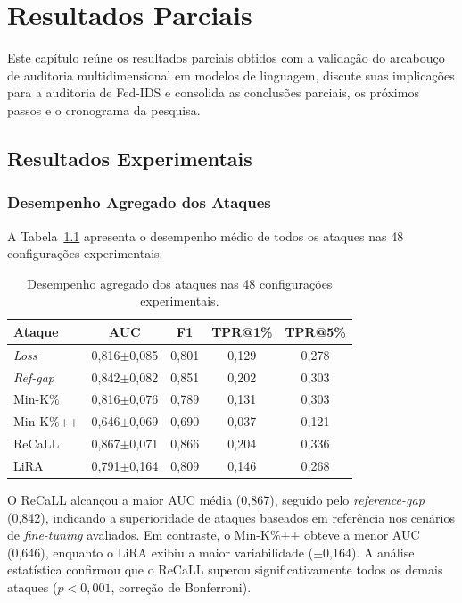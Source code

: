 \documentclass[
	12pt,				%
	openright,			%
	oneside,			%
	a4paper,			%
	english,			%
	french,				%
	spanish,			%
	brazil,				%
	]{abntex2}
\begin{document}
\chapter{Resultados Parciais}
\label{sec:resultados_parciais}

Este capítulo reúne os resultados parciais obtidos com a validação do arcabouço de auditoria multidimensional em modelos de linguagem, discute suas implicações para a auditoria de Fed-IDS e consolida as conclusões parciais, os próximos passos e o cronograma da pesquisa.

\section{Resultados Experimentais}

\subsection{Desempenho Agregado dos Ataques}

A Tabela~\ref{tab:aggregate_ciarp} apresenta o desempenho médio de todos os ataques nas 48 configurações experimentais.

\begin{table}[H]
\centering
\caption{Desempenho agregado dos ataques nas 48 configurações experimentais.}
\label{tab:aggregate_ciarp}
\begin{tabular}{lcccc}
\toprule
\textbf{Ataque} & \textbf{AUC} & \textbf{F1} & \textbf{TPR@1\%} & \textbf{TPR@5\%} \\
\midrule
\textit{Loss}       & 0,816$\pm$0,085 & 0,801 & 0,129 & 0,278 \\
\textit{Ref-gap}    & 0,842$\pm$0,082 & 0,851 & 0,202 & 0,303 \\
Min-K\%    & 0,816$\pm$0,076 & 0,789 & 0,131 & 0,303 \\
Min-K\%++  & 0,646$\pm$0,069 & 0,690 & 0,037 & 0,121 \\
ReCaLL     & 0,867$\pm$0,071 & 0,866 & 0,204 & 0,336 \\
LiRA       & 0,791$\pm$0,164 & 0,809 & 0,146 & 0,268 \\
\bottomrule
\end{tabular}
\end{table}

O ReCaLL alcançou a maior AUC média (0,867), seguido pelo \textit{reference-gap} (0,842), indicando a superioridade de ataques baseados em referência nos cenários de \textit{fine-tuning} avaliados. Em contraste, o Min-K\%++ obteve a menor AUC (0,646), enquanto o LiRA exibiu a maior variabilidade ($\pm$0,164). A análise estatística confirmou que o ReCaLL superou significativamente todos os demais ataques ($p < 0,001$, correção de Bonferroni).
\end{document}
